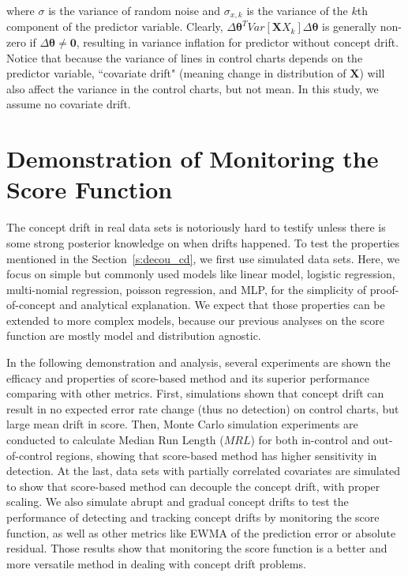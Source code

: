 \documentclass[twoside,11pt]{article}
\begin{document}
where $ \sigma$ is the variance of random noise and $ \sigma _{x,k}$ is the variance of the $k$th component of the predictor variable. Clearly, $\Delta \bm{\theta}^TVar [\bm {X}  X_{k}]\Delta \bm{\theta}$ is generally non-zero if $ \Delta \bm { \theta} \neq \bm {0}$, resulting in variance inflation for predictor without concept drift. Notice that because the variance of lines in control charts depends on the predictor variable, ``covariate drift" (meaning change in distribution of $\bm {X}$) will also affect the variance in the control charts, but not mean. In this study, we assume no covariate drift.

\section{Demonstration of Monitoring the Score Function}
\label{s:demon_cd}
The concept drift in real data sets is notoriously hard to testify unless there is some strong posterior knowledge on when drifts happened. To test the properties mentioned in the Section~\ref{s:decou_cd}, we first use simulated data sets. Here, we focus on simple but commonly used models like linear model, logistic regression, multi-nomial regression, poisson regression, and MLP, for the simplicity of proof-of-concept and analytical explanation. We expect that those properties can be extended to more complex models, because our previous analyses on the score function are mostly model and distribution agnostic. 

In the following demonstration and analysis, several experiments are shown the efficacy and properties of score-based method and its superior performance comparing with other metrics. First, simulations shown that concept drift can result in no expected error rate change (thus no detection) on control charts, but large mean drift in score. Then, Monte Carlo simulation experiments are conducted to calculate Median Run Length ($MRL$) for both in-control and out-of-control regions, showing that score-based method has higher sensitivity in detection. At the last, data sets with partially correlated covariates are simulated to show that score-based method can decouple the concept drift, with proper scaling.
We also simulate abrupt and gradual concept drifts to test the performance of detecting and tracking concept drifts by monitoring the score function, as well as other metrics like EWMA of the prediction error or absolute residual. Those results show that monitoring the score function is a better and more versatile method in dealing with concept drift problems. 
\end{document}
